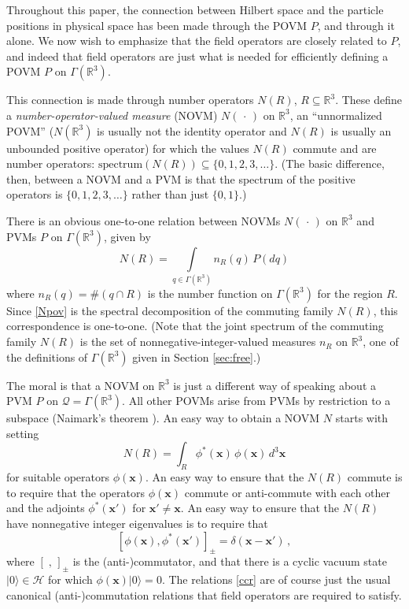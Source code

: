 \documentclass[12pt]{article}
\newcommand{\RRR}{\mathbb{R}} %
\newcommand{\1}{\mathbf{1}} %
\newcommand{\Hilbert}{\mathscr{H}}
\newcommand{\conf}{\mathcal{Q}} %
\newcommand{\pov}{{P}}%
\newcommand{\vx}{{\boldsymbol x}} %
\begin{document}
Throughout this paper, the connection between Hilbert space and the
particle positions in physical space has been made through the POVM
$\pov$, and through it alone.  We now wish to emphasize that the field
operators are closely related to $\pov$, and indeed that field
operators are just what is needed for efficiently defining a POVM
$\pov$ on $\Gamma(\RRR^3)$.

This connection is made through number operators $N(R)$, $R \subseteq
\RRR^3$.  These define a \emph{number-operator-valued measure} (NOVM)
$N(\,\cdot\,)$ on $\RRR^3$, an ``unnormalized POVM'' ($N(\RRR^3)$ is
usually not the identity operator and $N(R)$ is usually an unbounded
positive operator) for which the values $N(R)$ commute and are number
operators: $\mathrm{spectrum}(N(R)) \subseteq \{0,1,2,3,\ldots\}$.
(The basic difference, then, between a NOVM and a PVM is that the
spectrum of the positive operators is $\{0,1,2,3,\ldots\}$ rather than
just $\{0,1\}$.)

There is an obvious one-to-one relation between NOVMs $N(\,\cdot\,)$
on $\RRR^3$ and PVMs $\pov$ on $\Gamma(\RRR^3)$, given by
\begin{equation}\label{Npov}
   N(R) = \int\limits_{q\in\Gamma(\RRR^3)} n_R(q) \, \pov(dq)
\end{equation}
where $n_R(q) = \#(q \cap R)$ is the number function on
$\Gamma(\RRR^3)$ for the region $R$. Since \eqref{Npov} is the
spectral decomposition of the commuting family $N(R)$, this
correspondence is one-to-one. (Note that the joint spectrum of the
commuting family $N(R)$ is the set of nonnegative-integer-valued
measures $n_R$ on $\RRR^3$, one of the definitions of $\Gamma(\RRR^3)$
given in Section \ref{sec:free}.)

The moral is that a NOVM on $\RRR^3$ is just a different way of
speaking about a PVM $\pov$ on $\conf = \Gamma(\RRR^3)$.  All other
POVMs arise from PVMs by restriction to a subspace (Naimark's theorem
\cite{Davies}).  An easy way to obtain a NOVM $N$ starts with setting
\begin{equation}\label{Ndef}
   N(R) = \int_R \phi^*(\vx) \, \phi(\vx) \, d^3\vx
\end{equation}
for suitable operators $\phi(\vx)$.  An easy way to ensure that the 
$N(R)$
commute is to require that the operators $\phi(\vx)$ commute or
anti-commute
with each other and the adjoints $\phi^*(\vx')$ for $\vx'\neq \vx$.
An easy way to ensure that the $N(R)$ have nonnegative integer 
eigenvalues
is to require that
\begin{equation}\label{ccr}
   [\phi(\vx),\phi^*(\vx')]_\pm = \delta(\vx-\vx')\,,
\end{equation}
where $[ \;,\,]_\pm$ is the (anti\nobreakdash-)commutator, and that
there is a cyclic vacuum state $|0\rangle \in \Hilbert$ for which
$\phi(\vx)|0 \rangle =0$.  The relations \eqref{ccr} are of course
just the usual canonical (anti\nobreakdash-)commutation relations that
field operators are required to satisfy.
\end{document}
